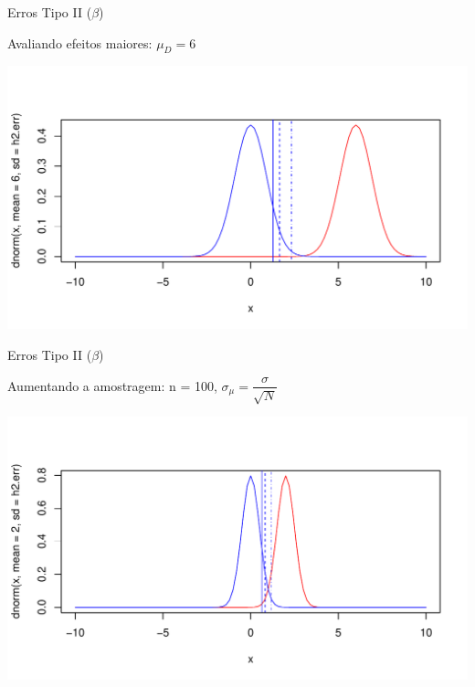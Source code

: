 \documentclass{beamer}\usepackage[]{graphicx}\usepackage[]{color}
\makeatletter
\def\maxwidth{ %
  \ifdim\Gin@nat@width>\linewidth
    \linewidth
  \else
    \Gin@nat@width
  \fi
}
\newenvironment{knitrout}{}{} %
\renewenvironment{knitrout}{\setlength{\topsep}{0mm}}{}
\makeatother
\begin{document}
\begin{frame}[fragile]{Erros Tipo II ($\beta$)}

Avaliando efeitos maiores: $\mu_D = 6$

\begin{knitrout}\tiny
{}\color{fgcolor}
\includegraphics[width=\maxwidth]{figure/erro4-1} 

\end{knitrout}

\end{frame}

\begin{frame}[fragile]{Erros Tipo II ($\beta$)}

Aumentando a amostragem: n = 100, $\sigma_{\mu} = \dfrac{\sigma}{\sqrt{N}}$

\vfill


\begin{knitrout}\tiny
{}\color{fgcolor}
\includegraphics[width=\maxwidth]{figure/erro8-1} 

\end{knitrout}

\end{frame}
\end{document}
